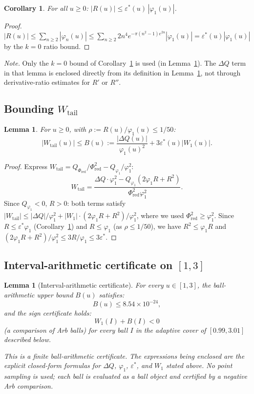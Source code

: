 \documentclass[11pt]{article}
\newtheorem{lemma}[theorem]{Lemma}
\newtheorem{corollary}[theorem]{Corollary}
\theoremstyle{definition}
\theoremstyle{remark}
\begin{document}
\begin{corollary}\label{cor:Rbounds}
For all $u \geq 0$: $|R(u)| \leq \varepsilon^*(u)\,|\varphi_1(u)|$.
\end{corollary}

\begin{proof}
$|R(u)| \leq \sum_{n\geq2}|\varphi_n(u)|
\leq \sum_{n\geq2} 2n^4 e^{-\pi(n^2-1)e^{2u}}|\varphi_1(u)|
= \varepsilon^*(u)|\varphi_1(u)|$ by the $k=0$ ratio bound.
\end{proof}

\noindent\emph{Note.}
Only the $k=0$ bound of Corollary~\ref{cor:Rbounds} is used
(in Lemma~\ref{lem:Wtail_bound}).
The $\Delta Q$ term in that lemma is enclosed directly from its
definition in Lemma~\ref{lem:Bsign}, not through derivative-ratio
estimates for $R'$ or $R''$.

\subsection{Bounding $W_{\mathrm{tail}}$}

\begin{lemma}\label{lem:Wtail_bound}
For $u \geq 0$, with $\rho := R(u)/\varphi_1(u) \leq 1/50$:
\[
|W_{\mathrm{tail}}(u)| \leq B(u) :=
\frac{|\Delta Q(u)|}{\varphi_1(u)^2} + 3\varepsilon^*(u)|W_1(u)|.
\]
\end{lemma}

\begin{proof}
Express $W_{\mathrm{tail}} = Q_{\Phi_{\mathrm{red}}}/\Phi_{\mathrm{red}}^2 - Q_{\varphi_1}/\varphi_1^2$:
\[
W_{\mathrm{tail}}
= \frac{\Delta Q\cdot\varphi_1^2 - Q_{\varphi_1}(2\varphi_1 R+R^2)}
       {\Phi_{\mathrm{red}}^2\varphi_1^2}.
\]
Since $Q_{\varphi_1}<0$, $R>0$: both terms satisfy
$|W_{\mathrm{tail}}| \leq {|\Delta Q|}/{\varphi_1^2} + |W_1|\cdot(2\varphi_1 R+R^2)/\varphi_1^2$,
where we used $\Phi_{\mathrm{red}}^2 \geq \varphi_1^2$.
Since $R \leq \varepsilon^*\varphi_1$ (Corollary~\ref{cor:Rbounds}) and
$R \leq \varphi_1$ (as $\rho \leq 1/50$), we have $R^2 \leq \varphi_1 R$ and
$(2\varphi_1 R+R^2)/\varphi_1^2 \leq 3R/\varphi_1 \leq 3\varepsilon^*$.
\end{proof}

\subsection{Interval-arithmetic certificate on $[1,3]$}

\begin{lemma}[Interval-arithmetic certificate]\label{lem:Bsign}
For every $u\in[1,3]$, the ball-arithmetic upper bound $B(u)$ satisfies:
\[
B(u) \leq 8.54\times 10^{-24},
\]
and the sign certificate holds:
\[
W_1(I) + B(I) < 0
\]
(a comparison of Arb balls) for every ball $I$ in the adaptive cover of
$[0.99, 3.01]$ described below.

This is a finite ball-arithmetic certificate.
The expressions being enclosed are the explicit closed-form formulas
for $\Delta Q$, $\varphi_1$, $\varepsilon^*$, and $W_1$ stated above.
No point sampling is used; each ball is evaluated as a ball object and
certified by a negative Arb comparison.
\end{lemma}
\end{document}
